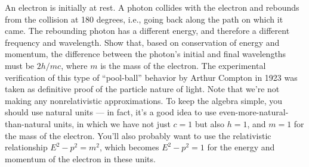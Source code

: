 An electron is initially at rest.
A photon collides with the electron and rebounds from the
collision at 180 degrees, i.e., going back along the path on
which it came. The rebounding photon has a different energy,
and therefore a different frequency and wavelength. Show
that, based on conservation of energy and momentum, the
difference between the photon's initial and final wavelengths
must be $2h/mc$, where $m$ is the mass of the
electron. The experimental verification of this type of
``pool-ball'' behavior by Arthur Compton in 1923 was taken
as definitive proof of the particle nature of light. Note that
we're not making any nonrelativistic approximations. To keep the
algebra simple, you should use natural units --- in fact, it's a good
idea to use even-more-natural-than-natural units, in which we have
not just $c=1$ but also $h=1$, and $m=1$ for the mass of the electron.
You'll also probably want to use the relativistic relationship $E^2-p^2=m^2$,
which becomes $E^2-p^2=1$ for the energy and momentum of the electron in
these units.
